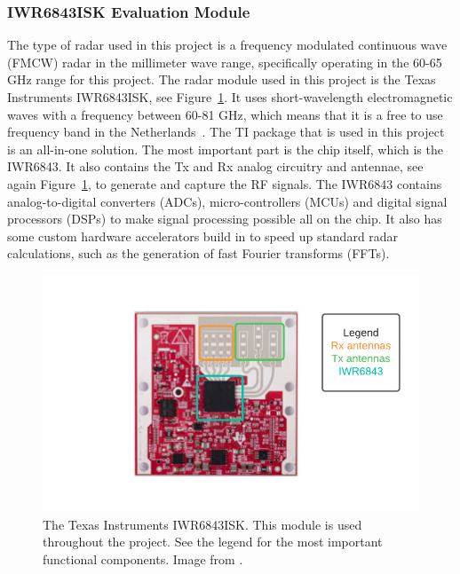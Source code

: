 \subsubsection{IWR6843ISK Evaluation Module}
The type of radar used in this project is a frequency modulated continuous wave (FMCW) radar in the millimeter wave range, specifically operating in the 60-65 GHz range for this project. The radar module used in this project is the Texas Instruments IWR6843ISK, see Figure~\ref{fig:iwr6843isk}. It uses short-wavelength electromagnetic waves with a frequency between 60-81 GHz, which means that it is a free to use frequency band in the Netherlands~\cite{freq_plan}. The TI package that is used in this project is an all-in-one solution. The most important part is the chip itself, which is the IWR6843. It also contains the Tx and Rx analog circuitry and antennae, see again Figure~\ref{fig:iwr6843isk}, to generate and capture the RF signals. The IWR6843 contains analog-to-digital converters (ADCs), micro-controllers (MCUs) and digital signal processors (DSPs) to make signal processing possible all on the chip. It also has some custom hardware accelerators build in to speed up standard radar calculations, such as the generation of fast Fourier transforms (FFTs).

\begin{figure}[t]
\centering
\includegraphics[width=.8\textwidth]{figures/background/IWR6843 legend.pdf}
\caption{The Texas Instruments IWR6843ISK. This module is used throughout the project. See the legend for the most important functional components. Image from \cite{iwr6843isk_website}.}
\label{fig:iwr6843isk}
\end{figure}

